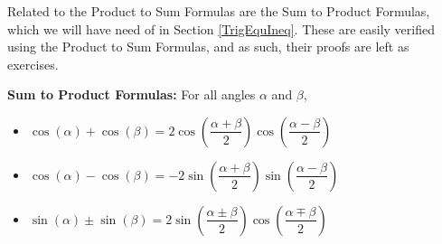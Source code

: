 \smallskip

Related to the Product to Sum Formulas are the Sum to Product Formulas, which we will have need of in Section \ref{TrigEquIneq}.  These are easily verified using the Product to Sum Formulas, and as such, their proofs are left as exercises.

\smallskip

\colorbox{ResultColor}{\bbm

\begin{thm} \label{sumtoproduct}  \textbf{Sum to Product Formulas:} For all angles $\alpha$ and $\beta$, 

\begin{itemize}

\item  $\cos(\alpha) + \cos(\beta) = 2 \cos\left( \dfrac{\alpha + \beta}{2}\right)\cos\left( \dfrac{\alpha - \beta}{2}\right) $

\item  $\cos(\alpha) -  \cos(\beta) = - 2 \sin\left( \dfrac{\alpha + \beta}{2}\right)\sin\left( \dfrac{\alpha - \beta}{2}\right) $

\item  $\sin(\alpha) \pm \sin(\beta) = 2 \sin\left( \dfrac{\alpha \pm \beta}{2}\right)\cos\left( \dfrac{\alpha \mp \beta}{2}\right) $

\end{itemize}

\end{thm}

\ebm}

\smallskip


